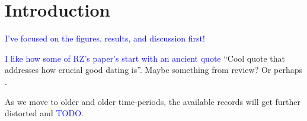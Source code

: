 \documentclass[draft]{agujournal2019}
\newcommand{\ijk}{\textcolor{blue}}
\begin{document}

%
%
%
%






\section{Introduction}\label{sec:intro}

\ijk{I've focused on the figures, results, and discussion first!}

\ijk{I like how some of RZ's paper's start with an ancient quote}
``Cool quote that addresses how crucial good dating is''.
Maybe something from  review? Or perhaps .

As we move to older and older time-periods, the available records will get further distorted and \ijk{TODO}.
\end{document}
